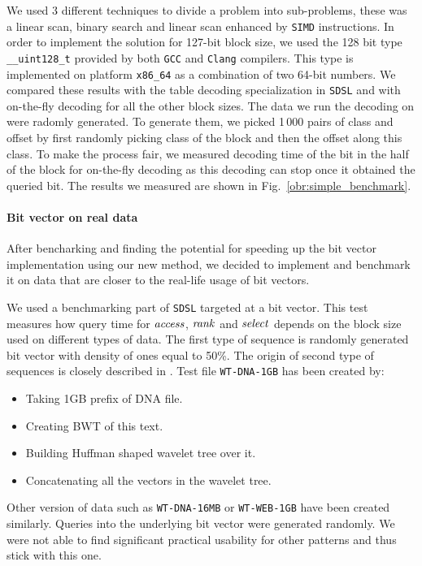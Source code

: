We used 3 different techniques to divide a problem into sub-problems, these was a linear scan,
binary search and linear scan enhanced by \texttt{SIMD} instructions. In order to implement the
solution for 127-bit block size, we used the 128 bit type \texttt{\_\_uint128\_t} provided by both
\texttt{GCC} and \texttt{Clang} compilers. This type is implemented on platform \texttt{x86\_64}
as a combination of two 64-bit numbers. We compared these results with the table decoding specialization
in \texttt{SDSL} and with on-the-fly decoding for all the other block sizes. The data we run the decoding
on were radomly generated. To generate them, we picked 1\,000 pairs of class and offset by first randomly
picking class of the block and then the offset along this class. To make the process fair, we measured
decoding time of the bit in the half of the block for on-the-fly decoding as this decoding can stop once
it obtained the queried bit. The results we measured are shown in Fig.~\ref{obr:simple_benchmark}.

\paragraph{Bit vector on real data}

After bencharking and finding the potential for speeding up the bit vector implementation using
our new method, we decided to implement and benchmark it on data that are closer to the real-life
usage of bit vectors.

We used a benchmarking part of \texttt{SDSL} targeted at a bit vector. This test measures how
query time for $\mathit{access}$, $\mathit{rank}$ and $\mathit{select}$ depends on the block size used on different types
of data. The first type of sequence is randomly generated bit vector with density of ones equal to
50\%. The origin of second type of sequences is closely described in \cite{gog2014optimized}.
Test file \texttt{WT-DNA-1GB} has been created by:
\begin{itemize}
	\item Taking 1GB prefix of DNA file.
	\item Creating BWT of this text.
	\item Building Huffman shaped wavelet tree over it.
	\item Concatenating all the vectors in the wavelet tree.
\end{itemize}

Other version of data such as \texttt{WT-DNA-16MB} or \texttt{WT-WEB-1GB} have been created similarly.
Queries into the underlying bit vector were generated randomly. We were not able to find significant
practical usability for other patterns and thus stick with this one.

